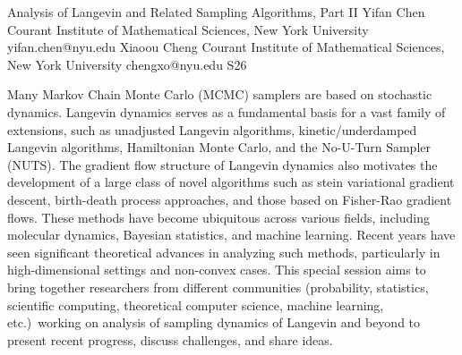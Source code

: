 

\clearpage

\begin{session}
 {Analysis of Langevin and Related Sampling Algorithms, Part II}%
 {Yifan Chen}%
 {Courant Institute of Mathematical Sciences, New York University}%
 {yifan.chen@nyu.edu}%
 {Xiaoou Cheng}%
 {Courant Institute of Mathematical Sciences, New York University}%
 {chengxo@nyu.edu}%
 {S26}%
 {}%

 Many Markov Chain Monte Carlo (MCMC) samplers are based on stochastic dynamics. Langevin dynamics serves as a fundamental basis for a vast family of extensions, such as unadjusted Langevin algorithms, kinetic/underdamped Langevin algorithms, Hamiltonian Monte Carlo, and the No-U-Turn Sampler (NUTS). The gradient flow structure of Langevin dynamics also motivates the development of a large class of novel algorithms such as stein variational gradient descent, birth-death process approaches, and those based on Fisher-Rao gradient flows. These methods have become ubiquitous across various fields, including molecular dynamics, Bayesian statistics, and machine learning. Recent years have seen significant theoretical advances in analyzing such methods, particularly in high-dimensional settings and non-convex cases. This special session aims to bring together researchers from different communities (probability, statistics, scientific computing, theoretical computer science, machine learning, etc.)\ working on analysis of sampling dynamics of Langevin and beyond to present recent progress, discuss challenges, and share ideas.
\end{session}



\clearpage

